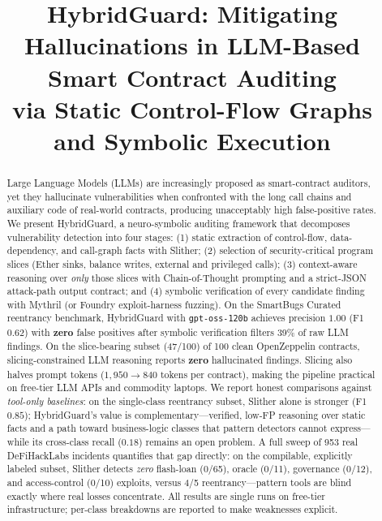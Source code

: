 \documentclass[conference]{IEEEtran}
\newcommand{\system}{HybridGuard}
\begin{document}
\title{\system{}: Mitigating Hallucinations in LLM-Based Smart Contract Auditing\\
via Static Control-Flow Graphs and Symbolic Execution}

\author{
}

\maketitle

\begin{abstract}
Large Language Models (LLMs) are increasingly proposed as smart-contract auditors, yet they
hallucinate vulnerabilities when confronted with the long call chains and auxiliary code of
real-world contracts, producing unacceptably high false-positive rates. We present \system{}, a
neuro-symbolic auditing framework that decomposes vulnerability detection into four stages:
(1) static extraction of control-flow, data-dependency, and call-graph facts with Slither;
(2) selection of security-critical program slices (Ether sinks, balance writes, external and
privileged calls); (3) context-aware reasoning over \emph{only} those slices with Chain-of-Thought
prompting and a strict-JSON attack-path output contract; and (4) symbolic verification of every
candidate finding with Mythril (or Foundry exploit-harness fuzzing). On the SmartBugs Curated
reentrancy benchmark, \system{} with \texttt{gpt-oss-120b} achieves precision $1.00$ (F1 $0.62$)
with \textbf{zero} false positives after symbolic verification filters 39\% of raw LLM findings.
On the slice-bearing subset (47/100) of 100 clean OpenZeppelin contracts, slicing-constrained LLM
reasoning reports \textbf{zero} hallucinated findings. Slicing also halves prompt tokens
($1{,}950 \rightarrow 840$ tokens per contract), making the pipeline practical on free-tier LLM
APIs and commodity laptops. We report honest comparisons against \emph{tool-only baselines}: on the
single-class reentrancy subset, Slither alone is stronger (F1 $0.85$); \system{}'s value is
complementary---verified, low-FP reasoning over static facts and a path toward business-logic
classes that pattern detectors cannot express---while its cross-class recall ($0.18$) remains an
open problem. A full sweep of 953 real DeFiHackLabs incidents quantifies that gap directly: on the
compilable, explicitly labeled subset, Slither detects \emph{zero} flash-loan (0/65), oracle (0/11),
governance (0/12), and access-control (0/10) exploits, versus 4/5 reentrancy---pattern tools are
blind exactly where real losses concentrate. All results are single runs on free-tier
infrastructure; per-class breakdowns are reported to make weaknesses explicit.
\end{abstract}
\end{document}

